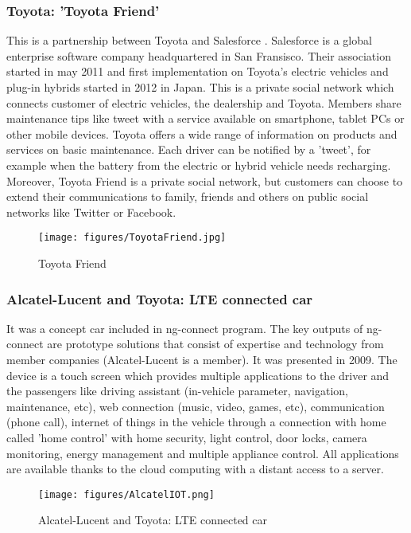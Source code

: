 \documentclass[a4paper]{article}
\begin{document}
\subsubsection{Toyota: 'Toyota Friend'}

This is a partnership between Toyota and Salesforce \cite{ToyotaFriend}.
Salesforce is a global enterprise software company headquartered in San Fransisco. Their association started in may 2011 and first implementation on Toyota's electric vehicles and plug-in hybrids started in 2012 in Japan. This is a private social network which connects customer of electric vehicles, the dealership and Toyota. 
Members share maintenance tips like tweet with a service available on smartphone, tablet PCs or other mobile devices. Toyota offers a wide range of information on products and services on basic maintenance. Each driver can be notified by a 'tweet', for example when the battery from the electric or hybrid vehicle needs recharging. Moreover, Toyota Friend is a private social network, but customers can choose to extend their communications to family, friends and others on public social networks like Twitter or Facebook.
\begin{figure}[!htb]
\begin{center}
\texttt{[image: figures/ToyotaFriend.jpg]}
\caption{Toyota Friend}
\end{center}
\end{figure}

\subsubsection{Alcatel-Lucent and Toyota: LTE connected car}

It was a concept car \cite{Alcatel} included in ng-connect program. The key outputs of ng-connect are prototype solutions that consist of expertise and technology from member companies (Alcatel-Lucent is a member). It was presented in 2009. The device is a touch screen which provides multiple applications to the driver and the passengers like driving assistant (in-vehicle parameter, navigation, maintenance, etc), web connection (music, video, games, etc), communication (phone call), internet of things in the vehicle through a connection with home called 'home control' with home security, light control, door locks, camera monitoring, energy management and multiple appliance control.
All applications are available thanks to the cloud computing with a distant access to a server.
\begin{figure}[!htb]
\begin{center}
\texttt{[image: figures/AlcatelIOT.png]}
\caption{Alcatel-Lucent and Toyota: LTE connected car}
\end{center}
\end{figure}
\end{document}
